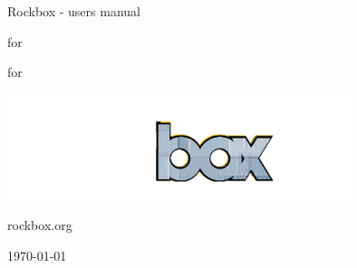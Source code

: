 \thispagestyle{empty}
\vspace*{0.3cm}
\begin{center}

\Huge {Rockbox - users manual}

\Huge {for }

\Huge {for \playername}


\includegraphics[width=10cm]{frontpage/rockbox3540.png}

\large rockbox.org


\today

\end{center}

\pagebreak
\thispagestyle{empty}
\cleardoublepage

